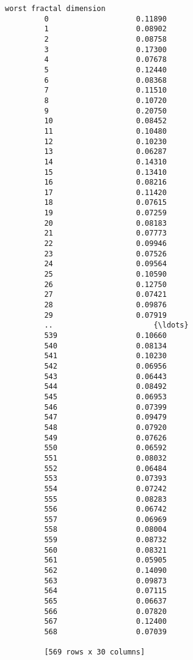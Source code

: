 \documentclass[11pt]{article}
\begin{document}
\begin{Verbatim}[commandchars=\\\{\}]
              worst fractal dimension  
         0                    0.11890  
         1                    0.08902  
         2                    0.08758  
         3                    0.17300  
         4                    0.07678  
         5                    0.12440  
         6                    0.08368  
         7                    0.11510  
         8                    0.10720  
         9                    0.20750  
         10                   0.08452  
         11                   0.10480  
         12                   0.10230  
         13                   0.06287  
         14                   0.14310  
         15                   0.13410  
         16                   0.08216  
         17                   0.11420  
         18                   0.07615  
         19                   0.07259  
         20                   0.08183  
         21                   0.07773  
         22                   0.09946  
         23                   0.07526  
         24                   0.09564  
         25                   0.10590  
         26                   0.12750  
         27                   0.07421  
         28                   0.09876  
         29                   0.07919  
         ..                       {\ldots}  
         539                  0.10660  
         540                  0.08134  
         541                  0.10230  
         542                  0.06956  
         543                  0.06443  
         544                  0.08492  
         545                  0.06953  
         546                  0.07399  
         547                  0.09479  
         548                  0.07920  
         549                  0.07626  
         550                  0.06592  
         551                  0.08032  
         552                  0.06484  
         553                  0.07393  
         554                  0.07242  
         555                  0.08283  
         556                  0.06742  
         557                  0.06969  
         558                  0.08004  
         559                  0.08732  
         560                  0.08321  
         561                  0.05905  
         562                  0.14090  
         563                  0.09873  
         564                  0.07115  
         565                  0.06637  
         566                  0.07820  
         567                  0.12400  
         568                  0.07039  
         
         [569 rows x 30 columns]
\end{Verbatim}
            
\end{document}
